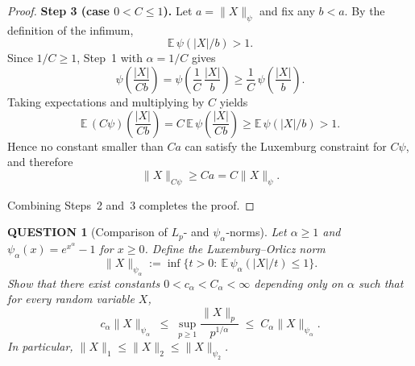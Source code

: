 \documentclass[12pt]{article}
\renewcommand{\(}{\left(}%
\renewcommand{\)}{\right)}%
\renewcommand{\[}{\left[}%
\renewcommand{\]}{\right]}%
\newtheorem{question}{QUESTION}[section]}
\newtheorem{proof}{Proof.}}
\begin{document}
\begin{proof}
\medskip
\textbf{Step 3 (case $0<C\le 1$).}
Let $a=\|X\|_{\psi}$ and fix any $b<a$. By the definition of the infimum,
\begin{equation*}
\mathbb E\,\psi(|X|/b)>1.
\end{equation*}
Since $1/C\ge 1$, Step~1 with $\alpha=1/C$ gives
\begin{equation*}
\psi\!\left(\frac{|X|}{Cb}\right)
=
\psi\!\left(\frac1C\,\frac{|X|}{b}\right)
\ge
\frac1C\,\psi\!\left(\frac{|X|}{b}\right).
\end{equation*}
Taking expectations and multiplying by $C$ yields
\begin{equation*}
\mathbb E\,(C\psi)\!\left(\frac{|X|}{Cb}\right)
=
C\,\mathbb E\,\psi\!\left(\frac{|X|}{Cb}\right)
\ge
\mathbb E\,\psi(|X|/b)
>1.
\end{equation*}
Hence no constant smaller than $Ca$ can satisfy the Luxemburg constraint for $C\psi$, and therefore
\begin{equation*}
\|X\|_{C\psi}\ge Ca = C\|X\|_{\psi}.
\end{equation*}

\medskip
Combining Steps~2 and~3 completes the proof.
\end{proof}

\begin{question}[Comparison of $L_p$- and $\psi_\alpha$-norms]
Let $\alpha\ge 1$ and $\psi_\alpha(x)=e^{x^\alpha}-1$ for $x\ge 0$. Define the Luxemburg--Orlicz norm
\begin{equation*}
\|X\|_{\psi_\alpha}:=\inf\Big\{t>0:\ \mathbb{E}\,\psi_\alpha(|X|/t)\le 1\Big\}.
\end{equation*}
Show that there exist constants $0<c_\alpha<C_\alpha<\infty$ depending only on $\alpha$ such that for every random variable $X$,
\begin{equation*}
c_\alpha \|X\|_{\psi_\alpha}
\;\le\;
\sup_{p\ge 1}\frac{\|X\|_p}{p^{1/\alpha}}
\;\le\;
C_\alpha \|X\|_{\psi_\alpha}.
\end{equation*}
In particular, $\|X\|_1\le \|X\|_2\le \|X\|_{\psi_2}$.
\end{question}
\end{document}
